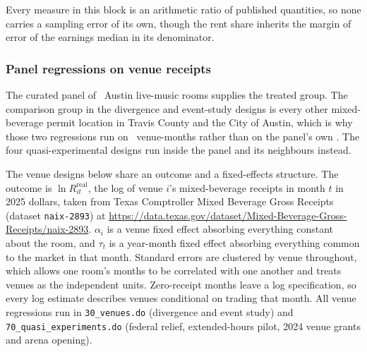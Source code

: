 Every measure in this block is an arithmetic ratio of published quantities,
so none carries a sampling error of its own, though the rent share inherits
the margin of error of the earnings median in its denominator.

\subsubsection*{Panel regressions on venue receipts}

The curated panel of \NVenuePanelIsCurated\ Austin live-music rooms supplies
the treated group. The comparison group in the divergence and event-study
designs is every other mixed-beverage permit location in Travis County and
the City of Austin, which is why those two regressions run on \NVenueDidN\
venue-months rather than on the panel's own \NQuasiPanelVenueMonths. The
four quasi-experimental designs run inside the panel and its neighbours
instead.

The venue designs below share an outcome and a fixed-effects structure. The
outcome is \(\ln R^{\mathrm{real}}_{it}\), the log of venue \(i\)'s
mixed-beverage receipts in month \(t\) in 2025 dollars, taken from Texas
Comptroller Mixed Beverage Gross Receipts (dataset \texttt{naix-2893}) at
\url{https://data.texas.gov/dataset/Mixed-Beverage-Gross-Receipts/naix-2893}.
\(\alpha_i\) is a venue fixed effect absorbing everything constant about the
room, and \(\tau_t\) is a year-month fixed effect absorbing everything
common to the market in that month. Standard errors are clustered by venue
throughout, which allows one room's months to be correlated with one another
and treats venues as the independent units. Zero-receipt months leave a log
specification, so every log estimate describes venues conditional on
trading that month. All venue regressions run in \texttt{30\_venues.do}
(divergence and event study) and \texttt{70\_quasi\_experiments.do}
(federal relief, extended-hours pilot, 2024 venue grants and arena
opening).

